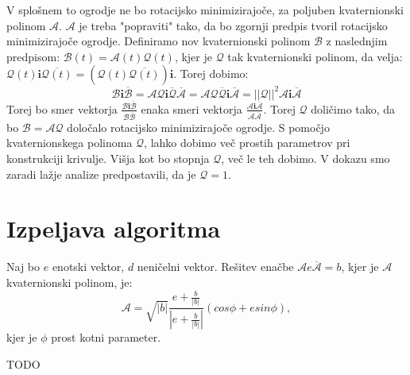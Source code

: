\documentclass[mat1]{fmfdelo}
\newcommand{\ii}{\boldsymbol i}
\newcommand{\A}{\mathcal A}
\newcommand{\B}{\mathcal B}
\newcommand{\QQ}{\mathcal Q}
\begin{document}
\begin{opomba}
V splošnem to ogrodje ne bo rotacijsko minimizirajoče, za poljuben kvaternionski polinom $\A$. $\A$ je treba "popraviti" tako, da bo zgornji predpis tvoril rotacijsko minimizirajoče ogrodje. Definiramo nov kvaternionski polinom $\B$ z naslednjim predpisom: $\B(t) = \A(t) \QQ(t)$, kjer je $\QQ$ tak kvaternionski polinom, da velja: $\QQ(t) \ii \overline{\QQ(t)} = \left( \QQ(t) \overline{\QQ(t)} \right) \ii$. Torej dobimo:
\begin{equation*}
	\B \ii \overline{\B} = \A \QQ \ii \overline{\QQ} \overline{\A} = \A \QQ \overline{\QQ} \ii \overline{\A} = ||\QQ||^2\A\ii\overline{\A}
\end{equation*}
Torej bo smer vektorja $\frac{\B \ii \overline{\B}}{\B  \overline{\B}}$ enaka smeri vektorja $\frac{\A \ii \overline{\A}}{\A  \overline{\A}}$. Torej $\QQ$ doličimo tako, da bo $\B = \A\QQ$ določalo rotacijsko minimizirajoče ogrodje. S pomočjo kvaternionskega polinoma $\QQ$, lahko dobimo več prostih parametrov pri konstrukciji krivulje. Višja kot bo stopnja $\QQ$, več le teh dobimo. V dokazu smo zaradi lažje analize predpostavili, da je $\QQ=1$.
\end{opomba}


\section{Izpeljava algoritma}
\iffalse

\begin{izrek}
Naj bo $e$ enotski vektor, $d$ neničelni vektor. Rešitev enačbe $\A e \overline{\A} = b$, kjer je $\A$ kvaternionski polinom, je:
\begin{equation*}
	\A = \sqrt{|b|} \frac{e+\frac{b}{|b|}}{|e+\frac{b}{|b|}|} \left( cos \phi + e sin\phi \right),
\end{equation*}
kjer je $\phi$ prost kotni parameter.
\end{izrek}

\begin{dokaz}
	TODO
\end{dokaz}
\end{document}
